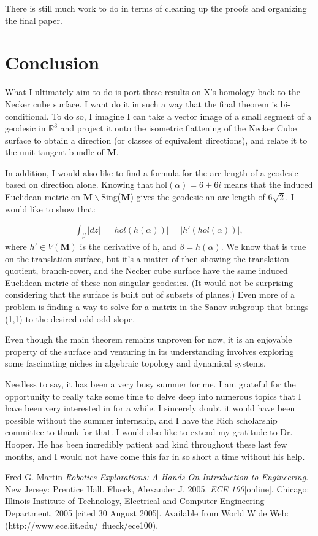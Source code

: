\documentclass[]{article}
\begin{document}
There is still much work to do in terms of cleaning up the proofs and organizing the final paper.

\newpage
\section*{Conclusion}
What I ultimately aim to do is port these results on X's homology back to the Necker cube surface. I want do it in such a way that the final theorem is bi-conditional. To do so, I imagine I can take a vector image of a small segment of a geodesic in $\mathbb{R}^3$ and project it onto the isometric flattening of the Necker Cube surface to obtain a direction (or classes of equivalent directions), and relate it to the unit tangent bundle of $\mathbf{M}$.

In addition, I would also like to find a formula for the arc-length of a geodesic based on direction alone. Knowing that hol$(\alpha)=6+6i$ means that the induced Euclidean metric on $\mathbf{M}\backslash$Sing($\mathbf{M}$) gives the geodesic an arc-length of $6\sqrt{2}$. I would like to show that:

\begin{align*}
\int_{\beta}|dz|=|hol(h(\alpha))|=|h'(hol(\alpha))|,
\end{align*}
\noindent where $h'\in V(\mathbf{M})$ is the derivative of h, and $\beta=h(\alpha)$. We know that is true on the translation surface, but it's a matter of then showing the translation quotient, branch-cover, and the Necker cube surface have the same induced Euclidean metric of these non-singular geodesics. (It would not be surprising considering that the surface is built out of subsets of planes.) Even more of a problem is finding a way to solve for a matrix in the Sanov subgroup that brings (1,1) to the desired odd-odd slope.

Even though the main theorem remains unproven for now, it is an enjoyable property of the surface and venturing in its understanding involves exploring some fascinating niches in algebraic topology and dynamical systems.

Needless to say, it has been a very busy summer for me. I am grateful for the opportunity to really take some time to delve deep into numerous topics that I have been very interested in for a while. I sincerely doubt it would have been possible without the summer internship, and I have the Rich scholarship committee to thank for that. I would also like to extend my gratitude to Dr. Hooper. He has been incredibly patient and kind throughout these last few months, and I would not have come this far in so short a time without his help. 


\newpage
\begin{thebibliography}{9}
 Fred G. Martin \emph{Robotics Explorations: A Hands-On Introduction to Engineering}. New Jersey: Prentice Hall.
  Flueck, Alexander J. 2005. \emph{ECE 100}[online]. Chicago: Illinois Institute of Technology, Electrical and Computer Engineering Department, 2005 [cited 30
August 2005]. Available from World Wide Web: (http://www.ece.iit.edu/~flueck/ece100).
\end{thebibliography}
\end{document}
